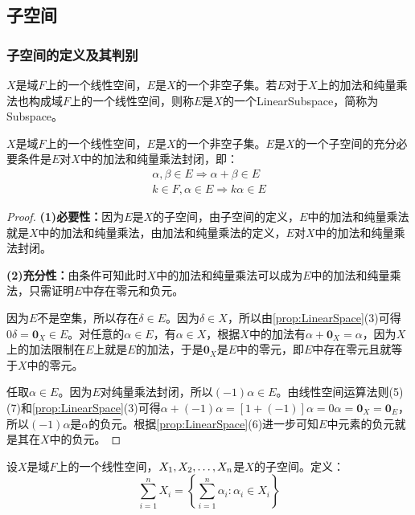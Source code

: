 \subsection{子空间}
\subsubsection{子空间的定义及其判别}
\begin{definition}
	$X$是域$F$上的一个线性空间，$E$是$X$的一个非空子集。若$E$对于$X$上的加法和纯量乘法也构成域$F$上的一个线性空间，则称$E$是$X$的一个\gls{LinearSubspace}，简称为\gls{Subspace}。
\end{definition}
\begin{theorem}\label{theo:Subspace}
	$X$是域$F$上的一个线性空间，$E$是$X$的一个非空子集。$E$是$X$的一个子空间的充分必要条件是$E$对$X$中的加法和纯量乘法封闭，即：
	\begin{gather*}
		\alpha,\beta\in E\Rightarrow\alpha+\beta\in E \\
		k\in F,\alpha\in E\Rightarrow k\alpha\in E
	\end{gather*}
\end{theorem}
\begin{proof}
	\textbf{(1)必要性：}因为$E$是$X$的子空间，由子空间的定义，$E$中的加法和纯量乘法就是$X$中的加法和纯量乘法，由加法和纯量乘法的定义，$E$对$X$中的加法和纯量乘法封闭。\par
	\textbf{(2)充分性：}由条件可知此时$X$中的加法和纯量乘法可以成为$E$中的加法和纯量乘法，只需证明$E$中存在零元和负元。\par
	因为$E$不是空集，所以存在$\delta\in E$。因为$\delta\in X$，所以由\cref{prop:LinearSpace}(3)可得$0\delta=\mathbf{0}_X\in E$。对任意的$\alpha\in E$，有$\alpha\in X$，根据$X$中的加法有$\alpha+\mathbf{0}_X=\alpha$，因为$X$上的加法限制在$E$上就是$E$的加法，于是$\mathbf{0}_X$是$E$中的零元，即$E$中存在零元且就等于$X$中的零元。\par
	任取$\alpha\in E$。因为$E$对纯量乘法封闭，所以$(-1)\alpha\in E$。由线性空间运算法则(5)(7)和\cref{prop:LinearSpace}(3)可得$\alpha+(-1)\alpha=[1+(-1)]\alpha=0\alpha=\mathbf{0}_X=\mathbf{0}_E$，所以$(-1)\alpha$是$\alpha$的负元。根据\cref{prop:LinearSpace}(6)进一步可知$E$中元素的负元就是其在$X$中的负元。
\end{proof}
\begin{definition}
	设$X$是域$F$上的一个线性空间，$X_1, X_2, \dots, X_{n}$是$X$的子空间。定义：
	\begin{equation*}
		\sum_{i=1}^{n}X_i=\left\{\sum_{i=1}^{n}\alpha_i:\alpha_i\in X_i\right\}
	\end{equation*}
\end{definition}
